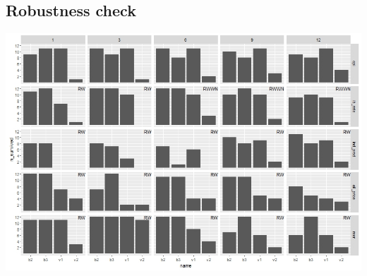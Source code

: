 \documentclass[a0, landscape]{a0poster}
\begin{document}
\begin{multicols}{3}
\subsection*{Robustness check}
\begin{center}
\includegraphics[scale=1]{model_selection}
\end{center}

%


\end{multicols}
\end{document}
